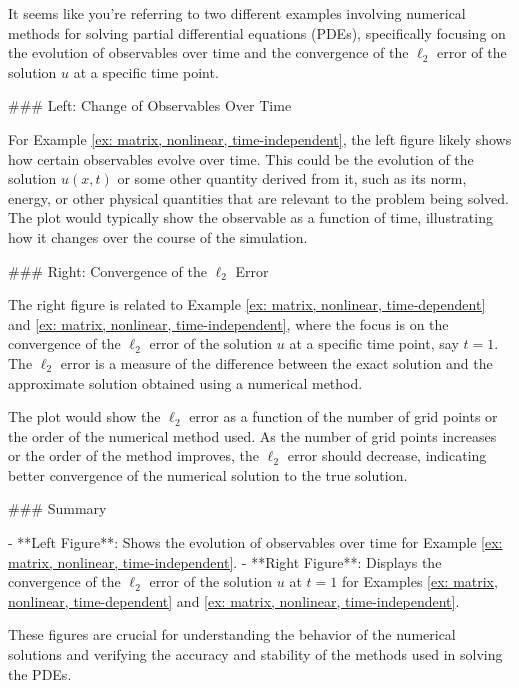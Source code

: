 It seems like you're referring to two different examples involving numerical methods for solving partial differential equations (PDEs), specifically focusing on the evolution of observables over time and the convergence of the $\ell_2$ error of the solution $u$ at a specific time point.

### Left: Change of Observables Over Time

For Example \ref{ex: matrix, nonlinear, time-independent}, the left figure likely shows how certain observables evolve over time. This could be the evolution of the solution $u(x,t)$ or some other quantity derived from it, such as its norm, energy, or other physical quantities that are relevant to the problem being solved. The plot would typically show the observable as a function of time, illustrating how it changes over the course of the simulation.

### Right: Convergence of the $\ell_2$ Error

The right figure is related to Example \ref{ex: matrix, nonlinear, time-dependent} and \ref{ex: matrix, nonlinear, time-independent}, where the focus is on the convergence of the $\ell_2$ error of the solution $u$ at a specific time point, say $t=1$. The $\ell_2$ error is a measure of the difference between the exact solution and the approximate solution obtained using a numerical method.

The plot would show the $\ell_2$ error as a function of the number of grid points or the order of the numerical method used. As the number of grid points increases or the order of the method improves, the $\ell_2$ error should decrease, indicating better convergence of the numerical solution to the true solution.

### Summary

- **Left Figure**: Shows the evolution of observables over time for Example \ref{ex: matrix, nonlinear, time-independent}.
- **Right Figure**: Displays the convergence of the $\ell_2$ error of the solution $u$ at $t=1$ for Examples \ref{ex: matrix, nonlinear, time-dependent} and \ref{ex: matrix, nonlinear, time-independent}.

These figures are crucial for understanding the behavior of the numerical solutions and verifying the accuracy and stability of the methods used in solving the PDEs.